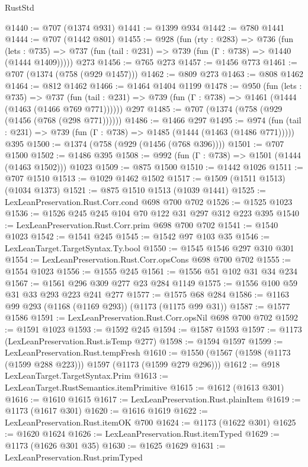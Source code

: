 \begin{lexlean}{RustStd}
\begin{coremodule}
@1440 := @707 (@1374 @931)
@1441 := @1399 @934
@1442 := @780 @1441
@1444 := @707 (@1442 @801)
@1455 := @928
    (fun (rty : @283) =>
    @736
      (fun (lets : @735) =>
      @737 (fun (tail : @231) => @739 (fun (Γ : @738) => @1440 (@1444 @1409)))))
    @273
@1456 := @765 @273
@1457 := @1456 @773
@1461 := @707 (@1374 (@758 (@929 @1457)))
@1462 := @809 @273
@1463 := @808 @1462
@1464 := @812 @1462
@1466 := @1464 @1404 @1199
@1478 := @950
    (fun (lets : @735) =>
    @737 (fun (tail : @231) => @739 (fun (Γ : @738) => @1461 (@1444 (@1463 (@1466 @769 @771))))))
    @297
@1485 := @707 (@1374 (@758 (@929 (@1456 (@768 (@298 @771))))))
@1486 := @1466 @297
@1495 := @974
    (fun (tail : @231) => @739 (fun (Γ : @738) => @1485 (@1444 (@1463 (@1486 @771)))))
    @395
@1500 := @1374 (@758 (@929 (@1456 (@768 @396))))
@1501 := @707 @1500
@1502 := @1486 @395
@1508 := @992 (fun (Γ : @738) => @1501 (@1444 (@1463 @1502))) @1023
@1509 := @875 @1500
@1510 := @1442 @1026
@1511 := @707 @1510
@1513 := @1029 @1462 @1502
@1517 := @1509 (@1511 @1513) (@1034 @1373)
@1521 := @875 @1510 @1513 (@1039 @1441)
@1525 := LexLeanPreservation.Rust.Corr.cond @698 @700 @702
@1526 := @1525 @1023
@1536 := @1526 @245 @245 @104 @70 @122 @31 @297 @312 @223 @395
@1540 := LexLeanPreservation.Rust.Corr.prim @698 @700 @702
@1541 := @1540 @1023
@1542 := @1541 @245
@1545 := @1542 @97 @103 @35
@1546 := LexLeanTarget.TargetSyntax.Ty.bool
@1550 := @1545 @1546 @297 @310 @301
@1554 := LexLeanPreservation.Rust.Corr.opsCons @698 @700 @702
@1555 := @1554 @1023
@1556 := @1555 @245
@1561 := @1556 @51 @102 @31 @34 @234
@1567 := @1561 @296 @309 @277 @23 @284 @1149
@1575 := @1556 @100 @59 @31 @33 @293 @223 @241 @277
@1577 := @1575 @68 @284
@1586 := @1163 @99 @293 (@1168 (@1169 @293)) (@1173 (@1175 @99 @31))
@1587 := @1577 @1586
@1591 := LexLeanPreservation.Rust.Corr.opsNil @698 @700 @702
@1592 := @1591 @1023
@1593 := @1592 @245
@1594 := @1587 @1593
@1597 := @1173 (LexLeanPreservation.Rust.isTemp @277)
@1598 := @1594 @1597
@1599 := LexLeanPreservation.Rust.tempFresh
@1610 := @1550 (@1567 (@1598 (@1173 (@1599 @288 @223))) @1597 (@1173 (@1599 @279 @296)))
@1612 := @918 LexLeanTarget.TargetSyntax.Prim
@1613 := LexLeanTarget.RustSemantics.itemPrimitive
@1615 := @1612 (@1613 @301)
@1616 := @1610 @1615
@1617 := LexLeanPreservation.Rust.plainItem
@1619 := @1173 (@1617 @301)
@1620 := @1616 @1619
@1622 := LexLeanPreservation.Rust.itemOK @700
@1624 := @1173 (@1622 @301)
@1625 := @1620 @1624
@1626 := LexLeanPreservation.Rust.itemTyped
@1629 := @1173 (@1626 @301 @35)
@1630 := @1625 @1629
@1631 := LexLeanPreservation.Rust.primTyped

\end{coremodule}
\end{lexlean}
